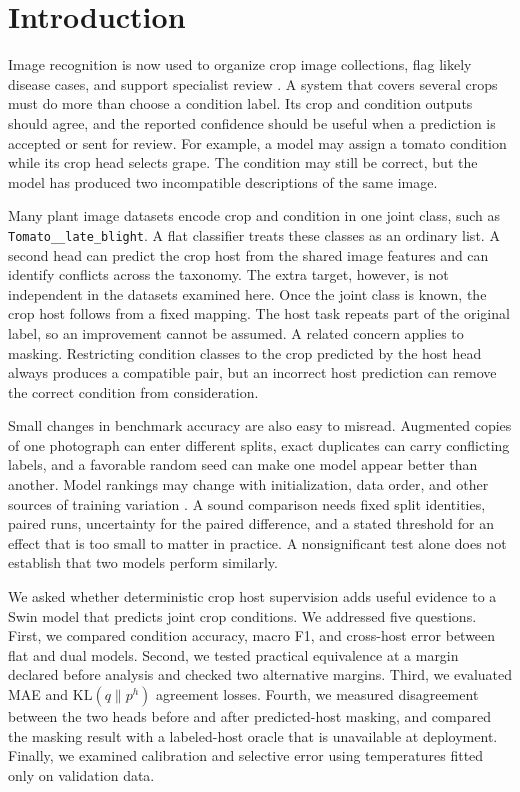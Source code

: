 \documentclass[preprint,12pt]{elsarticle}
\begin{document}
\section{Introduction}
\label{sec:introduction}

Image recognition is now used to organize crop image collections, flag likely
disease cases, and support specialist review \cite{mohanty2016,gui2021}. A
system that covers several crops must do more than choose a condition label. Its
crop and condition outputs should agree, and the reported confidence should be
useful when a prediction is accepted or sent for review. For example, a model
may assign a tomato condition while its crop head selects grape. The condition
may still be correct, but the model has produced two incompatible descriptions
of the same image.

Many plant image datasets encode crop and condition in one joint class, such as
\texttt{Tomato\_\_late\_blight}. A flat classifier treats these classes as an
ordinary list. A second head can predict the crop host from the shared image
features and can identify conflicts across the taxonomy. The extra target,
however, is not independent in the datasets examined here. Once the joint class
is known, the crop host follows from a fixed mapping. The host task repeats part
of the original label, so an improvement cannot be assumed. A related concern
applies to masking. Restricting condition classes to the crop predicted by the
host head always produces a compatible pair, but an incorrect host prediction
can remove the correct condition from consideration.

Small changes in benchmark accuracy are also easy to misread. Augmented copies
of one photograph can enter different splits, exact duplicates can carry
conflicting labels, and a favorable random seed can make one model appear
better than another. Model rankings may change with initialization, data order,
and other sources of training variation \cite{bouthillier2021}. A sound
comparison needs fixed split identities, paired runs, uncertainty for the
paired difference, and a stated threshold for an effect that is too small to
matter in practice. A nonsignificant test alone does not establish that two
models perform similarly.

We asked whether deterministic crop host supervision adds useful evidence to a
Swin model that predicts joint crop conditions. We addressed five questions.
First, we compared condition accuracy, macro F1, and cross-host error between
flat and dual models. Second, we tested practical equivalence at a margin
declared before analysis and checked two alternative margins. Third, we
evaluated MAE and $\mathrm{KL}(q\|p^h)$ agreement losses. Fourth, we measured
disagreement between the two heads before and after predicted-host masking, and
compared the masking result with a labeled-host oracle that is unavailable at
deployment. Finally, we examined calibration and selective error using
temperatures fitted only on validation data.
\end{document}
